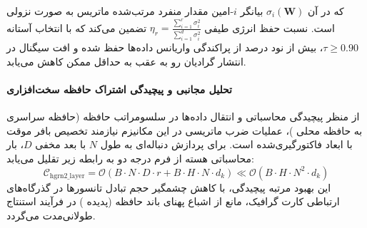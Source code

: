 
که در آن $\sigma_i(\mathbf{W})$ بیانگر $i$-امین مقدار منفرد مرتب‌شده ماتریس به صورت نزولی است. نسبت حفظ انرژی طیفی $\eta_r = \frac{\sum_{i=1}^r \sigma_i^2}{\sum_{i=1}^{d} \sigma_i^2}$ تضمین می‌کند که با انتخاب آستانه $\tau \ge 0.90$، بیش از نود درصد از پراکندگی واریانس داده‌ها حفظ شده و افت سیگنال در انتشار گرادیان رو به عقب به حداقل ممکن کاهش می‌یابد.

\paragraph{تحلیل مجانبی و پیچیدگی اشتراک حافظه سخت‌افزاری}
از منظر پیچیدگی محاسباتی و انتقال داده‌ها در سلسومراتب حافظه (حافظه سراسری  به حافظه محلی )، عملیات ضرب ماتریسی در این مکانیزم نیازمند تخصیص بافر موقت با ابعاد فاکتورگیری‌شده است. برای پردازش دنباله‌ای به طول $N$ با بعد مخفی $D$، بار محاسباتی هسته از فرم درجه دو به رابطه زیر تقلیل می‌یابد:
\begin{equation}
\label{eq:complexity_hgrn2_layer}
\mathcal{C}_{\text{hgrn2\_layer}} = \mathcal{O}\left( B \cdot N \cdot D \cdot r + B \cdot H \cdot N \cdot d_k \right) \ll \mathcal{O}\left( B \cdot H \cdot N^2 \cdot d_k \right)
\end{equation}
این بهبود مرتبه پیچیدگی، با کاهش چشمگیر حجم تبادل تانسورها در گذرگاه‌های ارتباطی کارت گرافیک، مانع از اشباع پهنای باند حافظه (پدیده ) در فرآیند استنتاج طولانی‌مدت می‌گردد.